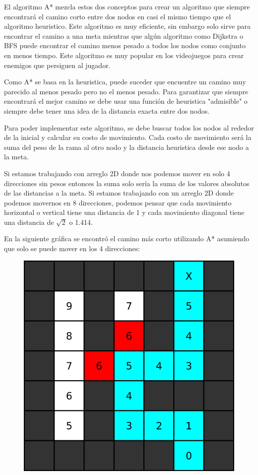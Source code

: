 \documentclass{article}
\begin{document}
El algoritmo A* mezcla estos dos conceptos para crear un algoritmo que siempre encontrará el camino corto entre dos nodos en casi el mismo tiempo que el algoritmo heuristico. Este algoritmo es muy eficiente, sin embargo solo sirve para encontrar el camino a una meta mientras que algún algoritmo como Dijkstra o BFS puede encontrar el camino menos pesado a todos los nodos como conjunto en menos tiempo. Este algoritmo es muy popular en los videojuegos para crear enemigos que persiguen al jugador.

Como A* se basa en la heuristica, puede suceder que encuentre un camino muy parecido al menos pesado pero no el menos pesado. Para garantizar que siempre encontrará el mejor camino se debe usar una función de heuristica "admisible" o siempre debe tener una idea de la distancia exacta entre dos nodos.

Para poder implementar este algoritmo, se debe buscar todos los nodos al rededor de la inicial y calcular su costo de movimiento. Cada costo de movimiento será la suma del peso de la rama al otro nodo y la distancia heuristica desde ese nodo a la meta.

Si estamos trabajando con arreglo 2D donde nos podemos mover en solo 4 direcciones sin pesos entonces la suma solo sería la suma de los valores absolutos de las distancias a la meta. Si estamos trabajando con un arreglo 2D donde podemos movernos en 8 direcciones, podemos pensar que cada movimiento horizontal o vertical tiene una distancia de 1 y cada movimiento diagonal tiene una distancia de $\sqrt{2}$ o 1.414.

En la siguiente gráfica se encontró el camino más corto utilizando A* asumiendo que solo se puede mover en los 4 direcciones:

\begin{figure}[H]
    \centering
    \includegraphics[width=0.32\paperwidth]{astrella}
\end{figure}
\end{document}
